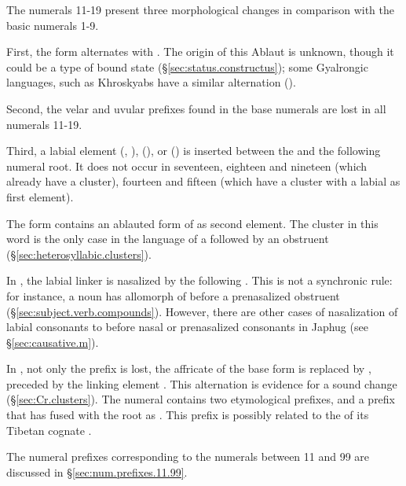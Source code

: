 The numerals 11-19 present three morphological changes in comparison with the basic numerals 1-9.

First, the form  alternates with . The origin of this Ablaut is unknown, though it could be a type of bound state (§\ref{sec:status.constructus}); some Gyalrongic languages, such as Khroskyabs have a similar alternation (\citealt[175--176]{lai17khroskyabs}). 

Second, the velar  and uvular  prefixes found in the base numerals are lost in all numerals 11-19.

Third, a labial element  (, ),  (), or  () is inserted between the  and the following numeral root. It does not occur in seventeen, eighteen and nineteen (which already have a cluster), fourteen and fifteen (which have a cluster with a labial as first element).

The form  contains an ablauted form of  as second element. The cluster  in this word is the only case in the language of a  followed by an obstruent (§\ref{sec:heterosyllabic.clusters}).

In , the labial linker is nasalized by the following . This is not a synchronic rule: for instance, a noun  has  allomorph of  before a prenasalized obstruent (§\ref{sec:subject.verb.compounds}). However, there are other cases of nasalization of labial consonants to  before nasal or prenasalized consonants in Japhug (see §\ref{sec:causative.m}).

In , not only the prefix  is lost, the  affricate of the base form 	 is replaced by , preceded by the linking element . This  \tld{}  alternation is evidence for a sound change  \fl{}  (§\ref{sec:Cr.clusters}).  The numeral  contains two etymological prefixes,  and a prefix  that has fused with the root as . This  prefix is possibly related to the  of its Tibetan cognate   .

The numeral prefixes corresponding to the numerals between 11 and 99 are discussed in §\ref{sec:num.prefixes.11.99}.

